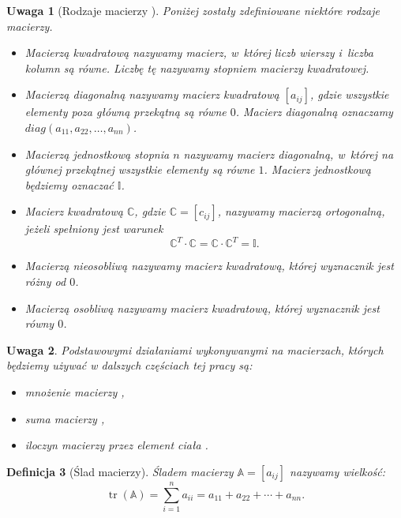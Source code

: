 \documentclass[12pt,a4paper]{report}
\newtheorem{df}{Definicja}[chapter]
\newtheorem{uwaga}[df]{Uwaga}
\newcommand{\tr}[1]{\operatorname{tr}\left({#1} \right)}
\begin{document}
\begin{uwaga}[Rodzaje macierzy {\citep[Sec 8.1, Sec 10.4]{alzega}}]
Poniżej zostały zdefiniowane niektóre rodzaje macierzy.
\begin{itemize}
\item Macierzą kwadratową nazywamy macierz, w~której liczb wierszy i~liczba kolumn są równe. Liczbę tę nazywamy stopniem macierzy kwadratowej.
\item Macierzą diagonalną nazywamy macierz kwadratową $[a_{ij}]$, gdzie wszystkie elementy poza główną przekątną są równe $0$. Macierz diagonalną oznaczamy 
\\$diag(a_{11}, a_{22}, \ldots , a_{nn})$.
\item Macierzą jednostkową stopnia $n$ nazywamy macierz diagonalną, w~której na głównej przekątnej wszystkie elementy są równe $1$. Macierz jednostkową będziemy oznaczać $\mathbb{I}$.
\item Macierz kwadratową $\mathbb{C}$, gdzie $\mathbb{C} = [c_{ij}]$, nazywamy macierzą ortogonalną, jeżeli spełniony jest warunek
$$
\mathbb{C}^T \cdot \mathbb{C} = \mathbb{C} \cdot \mathbb{C}^T = \mathbb{I}. 
$$
\item Macierzą nieosobliwą nazywamy macierz kwadratową, której wyznacznik jest różny od $0$.
\item Macierzą osobliwą nazywamy macierz kwadratową, której wyznacznik jest równy $0$.
\end{itemize}
\end{uwaga}

\begin{uwaga}
Podstawowymi działaniami wykonywanymi na macierzach, których będziemy używać w dalszych częściach tej pracy są:
\begin{itemize}
\item mnożenie macierzy {\citep[Sec 9.3 Def 9.13]{alzega}},
\item suma macierzy {\citep[Sec 8.1]{alzega}},
\item iloczyn macierzy przez element ciała {\citep[Sec 8.1]{alzega}}.
\end{itemize}
\end{uwaga}

\begin{df}[Ślad macierzy]{\citep[Sec 6.4]{ealIII}}
Śladem macierzy  $\mathbb{A} = [a_{ij}]$ nazywamy wielkość:
$$
\tr{\mathbb{A}} = \sum_{i=1}^n a_{ii} = a_{11} + a_{22} + \cdots + a_{nn}.
$$
\end{df}
\end{document}
